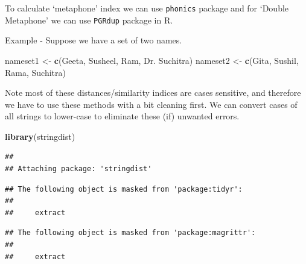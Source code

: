 \documentclass[
]{book}
\newenvironment{Shaded}{\begin{snugshade}}{\end{snugshade}}
\newcommand{\FunctionTok}[1]{\textcolor[rgb]{0.13,0.29,0.53}{\textbf{#1}}}
\newcommand{\NormalTok}[1]{#1}
\newcommand{\OtherTok}[1]{\textcolor[rgb]{0.56,0.35,0.01}{#1}}
\newcommand{\StringTok}[1]{\textcolor[rgb]{0.31,0.60,0.02}{#1}}
\begin{document}
To calculate `metaphone' index we can use \texttt{phonics} package and for `Double Metaphone' we can use \texttt{PGRdup} package in R.

Example - Suppose we have a set of two names.

\begin{Shaded}
\begin{Highlighting}[]
\NormalTok{nameset1 }\OtherTok{\textless{}{-}} \FunctionTok{c}\NormalTok{(}\StringTok{\textquotesingle{}Geeta\textquotesingle{}}\NormalTok{, }\StringTok{\textquotesingle{}Susheel\textquotesingle{}}\NormalTok{, }\StringTok{\textquotesingle{}Ram\textquotesingle{}}\NormalTok{, }\StringTok{\textquotesingle{}Dr. Suchitra\textquotesingle{}}\NormalTok{)}
\NormalTok{nameset2 }\OtherTok{\textless{}{-}} \FunctionTok{c}\NormalTok{(}\StringTok{\textquotesingle{}Gita\textquotesingle{}}\NormalTok{, }\StringTok{\textquotesingle{}Sushil\textquotesingle{}}\NormalTok{, }\StringTok{\textquotesingle{}Rama\textquotesingle{}}\NormalTok{, }\StringTok{\textquotesingle{}Suchitra\textquotesingle{}}\NormalTok{)}
\end{Highlighting}
\end{Shaded}

Note most of these distances/similarity indices are cases sensitive, and therefore we have to use these methods with a bit cleaning first. We can convert cases of all strings to lower-case to eliminate these (if) unwanted errors.

\begin{Shaded}
\begin{Highlighting}[]
\FunctionTok{library}\NormalTok{(stringdist)}
\end{Highlighting}
\end{Shaded}

\begin{verbatim}
## 
## Attaching package: 'stringdist'
\end{verbatim}

\begin{verbatim}
## The following object is masked from 'package:tidyr':
## 
##     extract
\end{verbatim}

\begin{verbatim}
## The following object is masked from 'package:magrittr':
## 
##     extract
\end{verbatim}
\end{document}
